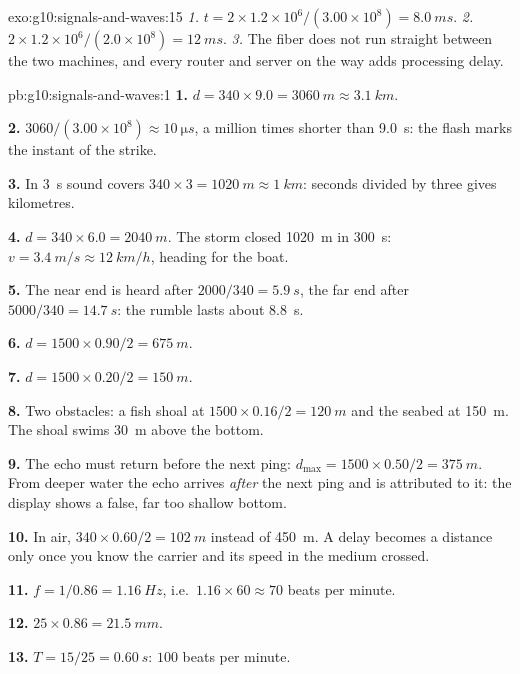 \begin{solution}{exo:g10:signals-and-waves:15}
\emph{1.} $t = 2 \times 1.2\times10^{6}/(3.00\times10^{8}) =
\qty{8.0}{ms}$.
\emph{2.} $2 \times 1.2\times10^{6}/(2.0\times10^{8}) = \qty{12}{ms}$.
\emph{3.} The fiber does not run straight between the two machines, and
every router and server on the way adds processing delay.
\end{solution}

\begin{solution}{pb:g10:signals-and-waves:1}
\textbf{1.} $d = 340 \times 9.0 = \qty{3060}{m} \approx \qty{3.1}{km}$.

\textbf{2.} $3060/(3.00\times10^{8}) \approx \qty{10}{\micro s}$, a
million times shorter than \qty{9.0}{s}: the flash marks the instant of
the strike.

\textbf{3.} In \qty{3}{s} sound covers $340 \times 3 = \qty{1020}{m}
\approx \qty{1}{km}$: seconds divided by three gives kilometres.

\textbf{4.} $d = 340 \times 6.0 = \qty{2040}{m}$. The storm closed
\qty{1020}{m} in \qty{300}{s}: $v = \qty{3.4}{m/s} \approx
\qty{12}{km/h}$, heading for the boat.

\textbf{5.} The near end is heard after $2000/340 = \qty{5.9}{s}$, the
far end after $5000/340 = \qty{14.7}{s}$: the rumble lasts about
\qty{8.8}{s}.

\textbf{6.} $d = 1500 \times 0.90/2 = \qty{675}{m}$.

\textbf{7.} $d = 1500 \times 0.20/2 = \qty{150}{m}$.

\textbf{8.} Two obstacles: a fish shoal at $1500 \times 0.16/2 =
\qty{120}{m}$ and the seabed at \qty{150}{m}. The shoal swims
\qty{30}{m} above the bottom.

\textbf{9.} The echo must return before the next ping:
$d_{\max} = 1500 \times 0.50/2 = \qty{375}{m}$. From deeper water the
echo arrives \emph{after} the next ping and is attributed to it: the
display shows a false, far too shallow bottom.

\textbf{10.} In air, $340 \times 0.60/2 = \qty{102}{m}$ instead of
\qty{450}{m}. A delay becomes a distance only once you know the carrier
and its speed in the medium crossed.

\textbf{11.} $f = 1/0.86 = \qty{1.16}{Hz}$, i.e.\ $1.16 \times 60
\approx 70$ beats per minute.

\textbf{12.} $25 \times 0.86 = \qty{21.5}{mm}$.

\textbf{13.} $T = 15/25 = \qty{0.60}{s}$: $100$ beats per minute.


\end{solution}
